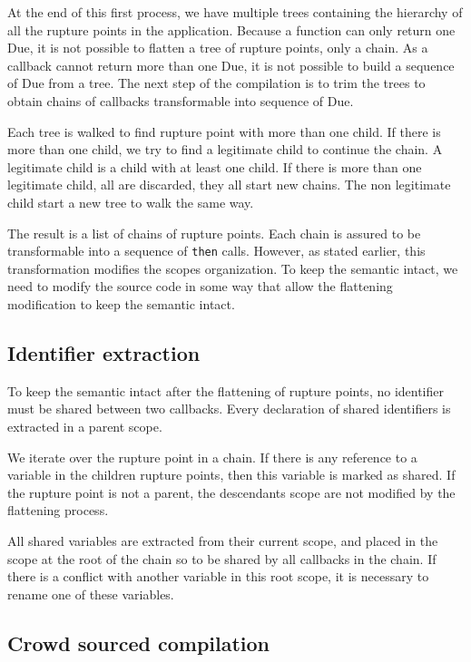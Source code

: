 At the end of this first process, we have multiple trees containing the hierarchy of all the rupture points in the application.
Because a function can only return one Due, it is not possible to flatten a tree of rupture points, only a chain.
As a callback cannot return more than one Due, it is not possible to build a sequence of Due from a tree.
The next step of the compilation is to trim the trees to obtain chains of callbacks transformable into sequence of Due.

Each tree is walked to find rupture point with more than one child.
If there is more than one child, we try to find a legitimate child to continue the chain.
A legitimate child is a child with at least one child.
If there is more than one legitimate child, all are discarded, they all start new chains.
The non legitimate child start a new tree to walk the same way.

The result is a list of chains of rupture points.
Each chain is assured to be transformable into a sequence of \texttt{then} calls.
However, as stated earlier, this transformation modifies the scopes organization.
To keep the semantic intact, we need to modify the source code in some way that allow the flattening modification to keep the semantic intact.


\subsection{Identifier extraction} \label{section:compiler:extraction}

To keep the semantic intact after the flattening of rupture points, no identifier must be shared between two callbacks.
Every declaration of shared identifiers is extracted in a parent scope.

We iterate over the rupture point in a chain.
If there is any reference to a variable in the children rupture points, then this variable is marked as shared.
If the rupture point is not a parent, the descendants scope are not modified by the flattening process.

All shared variables are extracted from their current scope, and placed in the scope at the root of the chain so to be shared by all callbacks in the chain.
If there is a conflict with another variable in this root scope, it is necessary to rename one of these variables.



\subsection{Crowd sourced compilation} \label{section:compiler:lib-compilation}

